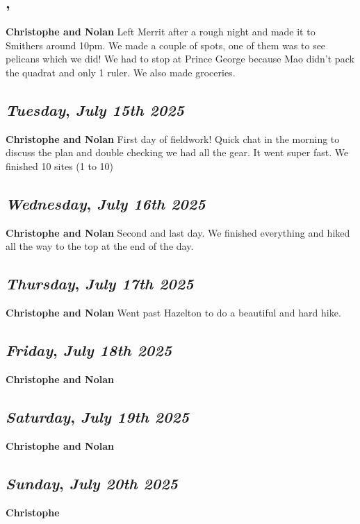 \subsection*{\weekday, \day}
\textbf {Christophe and Nolan}
Left Merrit after a rough night and made it to Smithers around 10pm. We made a couple of spots, one of them was to see pelicans which we did! We had to stop at Prince George because Mao didn't pack the quadrat and only 1 ruler. We also made groceries.

\def\day{\textit{July 15th 2025}}
\def\weekday{\textit{Tuesday}}
\subsection*{\weekday, \day}
\textbf {Christophe and Nolan}
First day of fieldwork! Quick chat in the morning to discuss the plan and double checking we had all the gear. It went super fast. We finished 10 sites (1 to 10)

\def\day{\textit{July 16th 2025}}
\def\weekday{\textit{Wednesday}}
\subsection*{\weekday, \day}
\textbf {Christophe and Nolan}
Second and last day. We finished everything and hiked all the way to the top at the end of the day.

\def\day{\textit{July 17th 2025}}
\def\weekday{\textit{Thursday}}
\subsection*{\weekday, \day}
\textbf {Christophe and Nolan}
Went past Hazelton to do a beautiful and hard hike.

\def\day{\textit{July 18th 2025}}
\def\weekday{\textit{Friday}}
\subsection*{\weekday, \day}
\textbf {Christophe and Nolan}

\def\day{\textit{July 19th 2025}}
\def\weekday{\textit{Saturday}}
\subsection*{\weekday, \day}
\textbf {Christophe and Nolan}

\def\day{\textit{July 20th 2025}}
\def\weekday{\textit{Sunday}}
\subsection*{\weekday, \day}
\textbf {Christophe}

